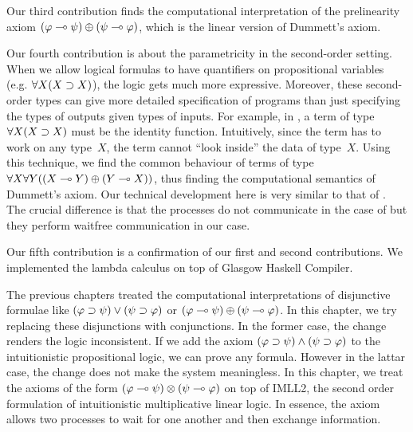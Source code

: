 Our third contribution finds the computational interpretation of
the prelinearity axiom
$(\varphi\multimap\psi)\oplus(\psi\multimap\varphi)$, which is the linear version of
Dummett's axiom.  

Our fourth contribution is about the parametricity in the second-order
setting.  When we allow logical formulas to have quantifiers on
propositional variables (e.g. $\forall X(X\supset X)$), the logic gets much
more expressive.
Moreover, these second-order types can give more detailed specification
of programs than just specifying the types of outputs given types of
inputs.
For example, in , a term of type $\forall X(X\supset X)$
must be the identity function.
Intuitively, since the term has to work on any type~$X$, the term cannot
``look inside''  the data of type~$X$.
Using this technique, we find the common behaviour of terms of type
$\forall X \forall Y ((X\multimap Y)\oplus (Y\multimap X))$, thus finding the
computational semantics of Dummett's axiom.
Our technical development here is very similar to that of
\citet{danos-krivine}.  The crucial difference is that the processes do
not communicate in the case of \citet{danos-krivine} but they perform
waitfree communication in our case.

Our fifth contribution is a confirmation of our first and second
contributions.
We implemented the lambda calculus on top of
Glasgow Haskell Compiler.


The previous chapters treated the computational interpretations of
disjunctive formulae like $(\varphi\supset\psi)\lor(\psi\supset\varphi)$ or
$(\varphi\multimap\psi)\oplus(\psi\multimap\varphi)$.  In this chapter, we try
replacing these disjunctions with conjunctions.
In the former case, the change renders the logic inconsistent.
If we add the axiom $(\varphi\supset\psi)\land(\psi\supset\varphi)$ to the
intuitionistic propositional logic,
we can prove any formula.  However in the lattar case, the change does
not make the system meaningless.
In this chapter, we treat
the axioms of the form $(\varphi\multimap\psi)\otimes(\psi\multimap\varphi)$
on top of IMLL2, the second order formulation of intuitionistic
multiplicative linear
logic.  In essence, the axiom allows two processes to wait for one
another and then exchange information.






